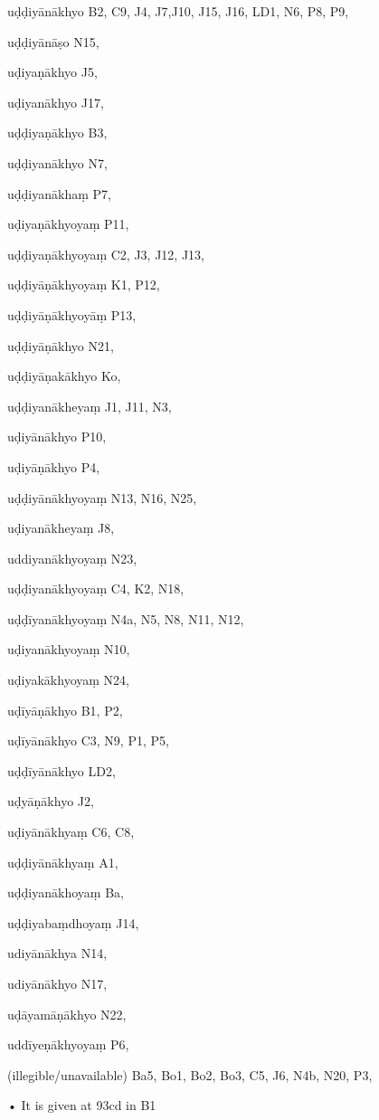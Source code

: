 \begin{marma}[hp03_059]


\item[uḍḍiyānākhyo] B2, C9, J4, J7,J10, J15, J16, LD1, N6, P8, P9,
\item[uḍḍiyānāṣo] N15,
\item[uḍiyaṇākhyo] J5,  
\item[uḍiyanākhyo] J17,
\item[uḍḍiyaṇākhyo] B3,
\item[uḍḍiyanākhyo] N7,
\item[uḍḍiyanākhaṃ] P7,
\item[uḍiyaṇākhyoyaṃ] P11,
\item[uḍḍiyaṇākhyoyaṃ] C2, J3, J12, J13, 
\item[uḍḍiyāṇākhyoyaṃ] K1, P12, 
\item[uḍḍiyāṇākhyoyāṃ] P13,
\item[uḍḍiyāṇākhyo] N21,
\item[uḍḍiyāṇakākhyo] Ko,
\item[uḍḍiyanākheyaṃ] J1, J11, N3, 
\item[uḍiyānākhyo] P10,
\item[uḍiyāṇākhyo] P4,
\item[uḍḍiyānākhyoyaṃ] N13, N16, N25, 
\item[uḍiyanākheyaṃ] J8,
\item[uddiyanākhyoyaṃ] N23,
\item[uḍḍiyanākhyoyaṃ] C4, K2, N18, 
\item[uḍḍīyanākhyoyaṃ] N4a, N5, N8, N11, N12, 
\item[uḍiyanākhyoyaṃ] N10,
\item[uḍiyakākhyoyaṃ] N24,
\item[uḍīyāṇākhyo] B1, P2, 
\item[uḍīyānākhyo] C3, N9, P1, P5, 
\item[uḍḍīyānākhyo] LD2,
\item[uḍyāṇākhyo] J2,
\item[uḍiyānākhyaṃ] C6, C8, 
\item[uḍḍiyānākhyaṃ] A1, 
\item[uḍḍiyanākhoyaṃ] Ba, 
\item[uḍḍiyabaṃdhoyaṃ] J14,
\item[udiyānākhya] N14,
\item[udiyānākhyo] N17,
\item[uḍāyamāṇākhyo] N22,
\item[uddīyeṇākhyoyaṃ] P6,
  \item[(illegible/unavailable)] Ba5, Bo1, Bo2, Bo3, C5, J6, N4b, N20, P3,

  \begin{description}
    • It is given at 93cd in B1
    \end{description}

  \end{marma}

